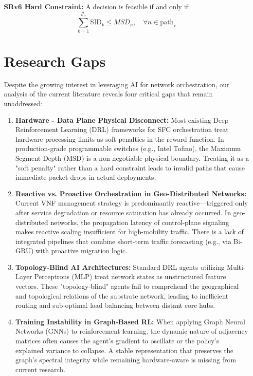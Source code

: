 \documentclass[12pt, a4paper, reqno, oneside]{book}
\begin{document}
\textbf{SRv6 Hard Constraint:}
A decision is feasible if and only if:
\begin{equation}
\sum_{k=1}^{\mathcal{J}_r} \text{SID}_k \le MSD_n, \quad \forall n \in \text{path}_r
\end{equation}

\section{Research Gaps}
\label{sec:gaps}
Despite the growing interest in leveraging AI for network orchestration, our analysis of the current literature reveals four critical gaps that remain unaddressed:

\begin{enumerate}[label=RG\arabic*., leftmargin=*, nosep]
    \item \textbf{Hardware - Data Plane Physical Disconnect:} Most existing Deep Reinforcement Learning (DRL) frameworks for SFC orchestration treat hardware processing limits as soft penalties in the reward function. In production-grade programmable switches (e.g., Intel Tofino), the Maximum Segment Depth (MSD) is a non-negotiable physical boundary. Treating it as a "soft penalty" rather than a hard constraint leads to invalid paths that cause immediate packet drops in actual deployments.

    \item \textbf{Reactive vs. Proactive Orchestration in Geo-Distributed Networks:} Current VNF management strategy is predominantly reactive—triggered only after service degradation or resource saturation has already occurred. In geo-distributed networks, the propagation latency of control-plane signaling makes reactive scaling insufficient for high-mobility traffic. There is a lack of integrated pipelines that combine short-term traffic forecasting (e.g., via Bi-GRU) with proactive migration logic.

    \item \textbf{Topology-Blind AI Architectures:} Standard DRL agents utilizing Multi-Layer Perceptrons (MLP) treat network states as unstructured feature vectors. These "topology-blind" agents fail to comprehend the geographical and topological relations of the substrate network, leading to inefficient routing and sub-optimal load balancing between distant core hubs.

    \item \textbf{Training Instability in Graph-Based RL:} When applying Graph Neural Networks (GNNs) to reinforcement learning, the dynamic nature of adjacency matrices often causes the agent's gradient to oscillate or the policy's explained variance to collapse. A stable representation that preserves the graph's spectral integrity while remaining hardware-aware is missing from current research.
\end{enumerate}
\end{document}
